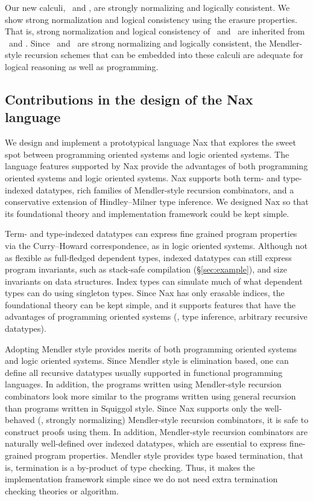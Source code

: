 Our new calculi, \Fi\ and \Fixi, are strongly normalizing and
logically consistent. We show strong normalization and logical consistency
using the erasure properties. That is, strong normalization and
logical consistency of \Fi\ and \Fixi\ are inherited from \Fw\ and \Fixw.
Since \Fi\ and \Fixi\ are strong normalizing and logically  consistent,
the Mendler-style recursion schemes that can be embedded into these calculi
are adequate for logical reasoning as well as programming.

\subsection{Contributions in the design of the Nax language}
We design and implement a prototypical language Nax that explores
the sweet spot between programming oriented systems and logic oriented systems.
The language features supported by Nax provide the advantages
of both programming oriented systems and logic oriented systems.
Nax supports both term- and type-indexed datatypes,
rich families of Mendler-style recursion combinators,
and a conservative extension of Hindley--Milner type inference.
We designed Nax so that its foundational theory and
implementation framework could be kept simple.

Term- and type-indexed datatypes can express fine grained program properties
via the Curry--Howard correspondence, as in logic oriented systems. Although
not as flexible as full-fledged dependent types, indexed datatypes can
still express program invariants, such as stack-safe compilation
(\S\ref{sec:example}), and size invariants on data structures.
Index types can simulate much of what
dependent types can do using singleton types. Since Nax has only erasable
indices, the foundational theory can be kept simple, and it supports
features that have the advantages of programming oriented systems 
(\eg, type inference, arbitrary recursive datatypes).

Adopting Mendler style provides merits of both programming oriented systems
and logic oriented systems. Since Mendler style is elimination based, one can
define all recursive datatypes usually supported in functional programming
languages. In addition, the programs written using Mendler-style recursion
combinators look more similar to the programs written using general recursion
than programs written in Squiggol style.
Since Nax supports only the well-behaved (\ie, strongly normalizing)
Mendler-style recursion combinators, it is safe to construct proofs using them.
In addition, Mendler-style recursion combinators are naturally well-defined
over indexed datatypes, which are essential to express fine-grained program
properties. Mendler style provides type based termination, that is, termination
is a by-product of type checking. Thus, it makes the implementation framework
simple since we do not need extra termination checking theories or algorithm.

